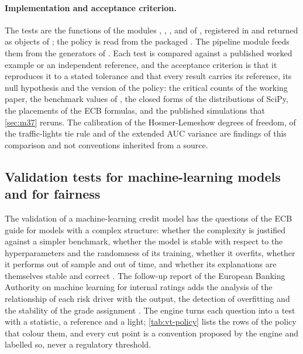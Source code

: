 \paragraph{Implementation and acceptance criterion.} The tests are the functions of the modules , , ,  and
 of  \vtEngineVersion{}, registered in  and returned as  objects of ; the policy
is  read from the packaged . The pipeline module  feeds them from the generators of
. Each test is compared against a published worked example or an independent reference, and the acceptance criterion is that it reproduces it to a stated tolerance and that every result
carries its reference, its null hypothesis and the version of the policy: the critical counts of the working paper, the benchmark values of \citet{credit-scoring:yurdakul2020}, the closed forms of the
distributions of SciPy, the placements of the ECB formulas, and the published simulations that \cref{sec:m37} reruns. The calibration of the Hosmer-Lemeshow degrees of freedom, of the traffic-lights tie rule and of the
extended AUC variance are findings of this comparison and not conventions inherited from a source.
\par\endgroup

\subsection{Validation tests for machine-learning models and for fairness}
\label{sec:m29}

The validation of a machine-learning credit model has the questions of the ECB guide for models with a complex structure: whether the complexity is justified against a simpler benchmark, whether the model is stable
with respect to the hyperparameters and the randomness of its training, whether it overfits, whether it performs out of sample and out of time, and whether its explanations are themselves stable and correct
\citep{validation-tests:ecb2025egim}. The follow-up report of the European Banking Authority on machine learning for internal ratings adds the analysis of the relationship of each risk driver with the output, the
detection of overfitting and the stability of the grade assignment \citep{validation-tests:eba2023ml}. The engine turns each question into a test with a statistic, a reference and a light; \cref{tab:vt-policy} lists the
rows of the policy that colour them, and every cut point is a convention proposed by the engine and labelled so, never a regulatory threshold.

